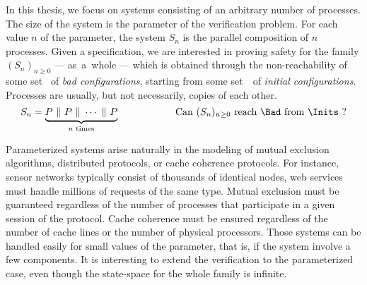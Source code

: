 \label{chapter:parameterized:systems}
%
In this thesis, we focus on systems consisting of an arbitrary number
of processes. The size of the system is the parameter of the
verification problem.
% 
For each value $n$ of the parameter, the system $S_n$ is the parallel
composition of $n$ processes.
%
%
%
%
%
Given a specification, we are interested in proving safety for the
family $(S_n)_{n\ge 0}$ --- as~a~whole --- which is obtained through
the non-reachability of some set \Bad\ of \emph{bad configurations},
starting from some set~\Inits\ of \emph{initial configurations}. %
%
Processes are usually, but not necessarily, copies of each other.
%
\[ S_n = \underbrace{P\ \|\ P\ \|\ \cdots\ \|\ P}_{n\text{ times}}\hspace{2cm}\text{Can } (S_n)_{n\ge 0} \text{ reach }\Bad\text{ from }\Inits\text{ ?} \]
% 

%
%
%
%
Parameterized systems arise naturally in the modeling of mutual
exclusion algorithms, distributed protocols, or cache coherence
protocols. %
For instance, sensor networks typically consist of thousands of
identical nodes, web services must handle millions of requests of the
same type. %
Mutual exclusion must be guaranteed regardless of the number of
processes that participate in a given session of the protocol. %
Cache coherence must be ensured regardless of the number of cache
lines or the number of physical processors.
% 
Those systems can be handled easily for small values of the parameter,
that is, if the system involve a few components. It is interesting to
extend the verification to the parameterized case, even though the
state-space for the whole family is infinite.
%





\newpage


